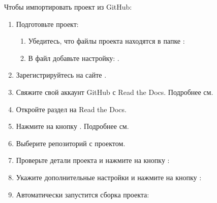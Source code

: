 \documentclass[a4paper,12pt,russian]{sphinxmanual}
\begin{document}
Чтобы импортировать проект из GitHub:
\begin{enumerate}
%
\item {} 
Подготовьте проект:
\begin{enumerate}
%
\item {} 
Убедитесь, что файлы проекта находятся в папке :


\item {} 
В файл  добавьте настройку: .

\end{enumerate}

\item {} 
Зарегистрируйтесь на сайте .

\item {} 
Свяжите свой аккаунт GitHub с Read the Docs. Подробнее см. 

\item {} 
Откройте раздел  на Read the Docs.


\item {} 
Нажмите на кнопку . Подробнее см. 

\item {} 
Выберите репозиторий с проектом.

\item {} 
Проверьте детали проекта и нажмите на кнопку :


\item {} 
Укажите дополнительные настройки и нажмите на кнопку :


\item {} 
Автоматически запустится сборка проекта:


\end{enumerate}
\end{document}
